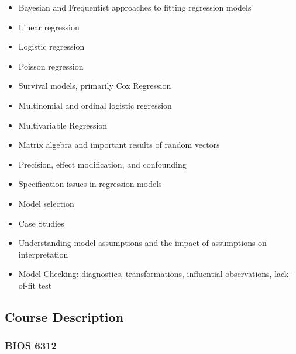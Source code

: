 \documentclass[
  letterpaper,
  DIV=11,
  numbers=noendperiod]{scrartcl}
\providecommand{\tightlist}{%
  \setlength{\itemsep}{0pt}\setlength{\parskip}{0pt}}\usepackage{longtable,booktabs,array}
\begin{document}
\begin{itemize}
\tightlist
\item
  Bayesian and Frequentist approaches to fitting regression models
\item
  Linear regression
\item
  Logistic regression
\item
  Poisson regression
\item
  Survival models, primarily Cox Regression
\item
  Multinomial and ordinal logistic regression
\item
  Multivariable Regression
\item
  Matrix algebra and important results of random vectors
\item
  Precision, effect modification, and confounding
\item
  Specification issues in regression models
\item
  Model selection
\item
  Case Studies
\item
  Understanding model assumptions and the impact of assumptions on
  interpretation
\item
  Model Checking: diagnostics, transformations, influential
  observations, lack-of-fit test
\end{itemize}

\hypertarget{course-description}{%
\subsection{Course Description}\label{course-description}}

\hypertarget{bios-6312}{%
\subsubsection{BIOS 6312}\label{bios-6312}}
\end{document}

